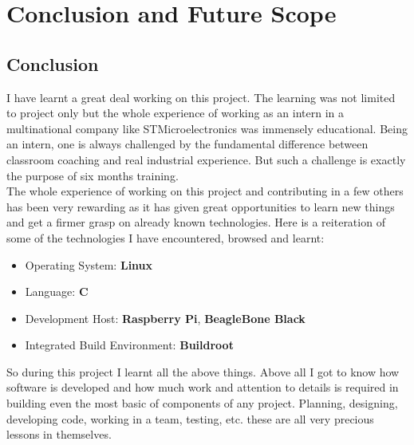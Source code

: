 \chapter{Conclusion and Future Scope}
\section{Conclusion}
I have learnt a great deal working on this project. The learning was not limited to project only but the whole experience of working as an intern in a multinational company like STMicroelectronics was immensely educational. Being an intern, one is always challenged by the fundamental difference between classroom coaching and real industrial experience. But such a challenge is exactly the purpose of six months training.\\
The whole experience of working on this project and contributing in a few others has been very rewarding as it has given great opportunities to learn new things and get a firmer grasp on already known technologies. Here is a reiteration of some of the technologies I have encountered, browsed and learnt:\\
\begin{itemize}
	\item Operating System: \textbf{Linux}
	\item Language: \textbf{C}
	\item Development Host: \textbf{Raspberry Pi}, \textbf{BeagleBone Black}
	\item Integrated Build Environment: \textbf{Buildroot}
\end{itemize}
So during this project I learnt all the above things. Above all I got to know how software is developed and how much work and attention to details is required in building even the most basic of components of any project. Planning, designing, developing code, working in a team, testing, etc. these are all very precious lessons in themselves. 
